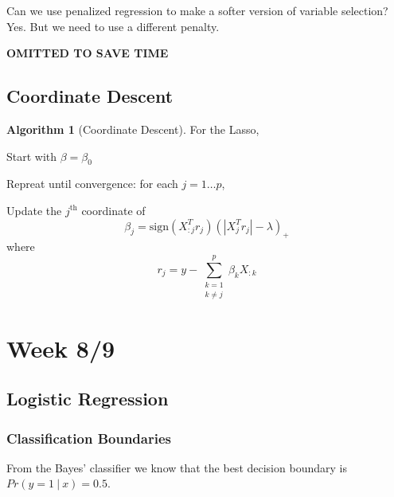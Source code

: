 \documentclass[11pt]{article}
\newenvironment{indentone}{\begin{adjustwidth}{3em}{0em}}{\end{adjustwidth}}
\theoremstyle{definition}
\newtheorem{algorithm}{Algorithm}[section]
\numberwithin{equation}{section}
\begin{document}
\begin{writenotes}
  Can we use penalized regression to make a softer version of variable selection? Yes. But we need to use a different penalty.
\end{writenotes}

\textbf{OMITTED TO SAVE TIME}

\subsection{Coordinate Descent}

\begin{algorithm}[Coordinate Descent]
For the Lasso,

  \begin{enumerate}
    \item Start with $\beta = \beta_0$
    \item Repreat until convergence: for each $j=1\dots p$,
    \begin{indentone}
      \item Update the $j^{\text{th}}$ coordinate of
      \begin{equation}
        \beta_j = \text{sign}(X^T_{:j}r_j)\left( |X^T_jr_j| - \lambda \right)_+
      \end{equation}
      where
      \begin{equation}
      r_j = y - \sum^p_{\substack{k=1\\k\neq j}}\beta_k X_{:k}
      \end{equation}
    \end{indentone}
  \end{enumerate}
\end{algorithm}


\newpage

\section{Week 8/9}
\subsection{Logistic Regression}
\subsubsection{Classification Boundaries}

 From the Bayes' classifier we know that the best decision boundary is $Pr(y=1\>|\>x)=0.5$.
\end{document}

